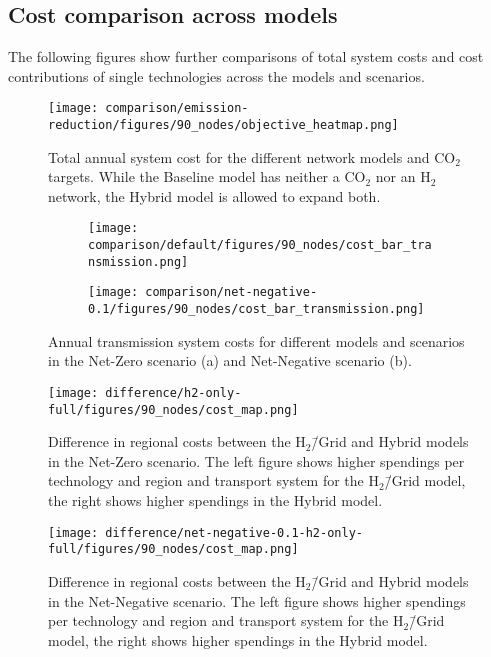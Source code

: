 \documentclass[twocolumn]{article}
\newcommand{\COtwo}{CO$_2$}
\newcommand{\Htwo}{H$_2$}
\newcommand{\Hgrid}{H$_2$\=/Grid}
\newcommand{\modBase}{Baseline model}
\newcommand{\modH}{H$_2$\=/Grid model}
\newcommand{\modHybrid}{Hybrid model}
\begin{document}
\subsection{Cost comparison across models}

The following figures show further comparisons of total system costs and cost contributions of single technologies across the models and scenarios.

\begin{figure}[h!]
    \centering
    \texttt{[image: comparison/emission-reduction/figures/90\_nodes/objective\_heatmap.png]}
    \caption{Total annual system cost for the different network models and \COtwo{} targets. While the \modBase{} has neither a \COtwo{} nor an \Htwo{} network, the \modHybrid{} is allowed to expand both.}
    \label{fig:objective_heatmap}
\end{figure}

\begin{figure}[ht]
    \centering
    \begin{subfigure}{.5\textwidth}
        \centering
        \texttt{[image: comparison/default/figures/90\_nodes/cost\_bar\_transmission.png]}
        \caption{}
        \label{fig:cost_bar_transmission}
    \end{subfigure}%
    \begin{subfigure}{.5\textwidth}
        \centering
        \texttt{[image: comparison/net-negative-0.1/figures/90\_nodes/cost\_bar\_transmission.png]}
        \caption{}
        \label{fig:cost_bar_transmission_nn}
    \end{subfigure}
    \caption{Annual transmission system costs for different models and scenarios in the Net-Zero scenario (a) and Net-Negative scenario (b).}
\end{figure}


\begin{figure}[ht!]
    \centering
    \texttt{[image: difference/h2-only-full/figures/90\_nodes/cost\_map.png]}
    \caption{Difference in regional costs between the \Hgrid{} and \modHybrid{}s in the Net-Zero scenario. The left figure shows higher spendings per technology and region and transport system for the \modH{}, the right shows higher spendings in the \modHybrid{}.}
    \label{fig:cost_map_difference}
\end{figure}


\begin{figure}[ht!]
    \centering
    \texttt{[image: difference/net-negative-0.1-h2-only-full/figures/90\_nodes/cost\_map.png]}
    \caption{Difference in regional costs between the \Hgrid{} and \modHybrid{}s in the Net-Negative scenario. The left figure shows higher spendings per technology and region and transport system for the \modH{}, the right shows higher spendings in the \modHybrid{}.}
    \label{fig:cost_map_difference_nn}
\end{figure}
\end{document}
